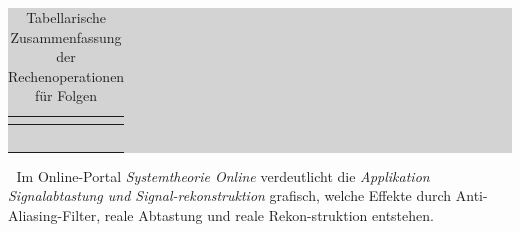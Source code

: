 \begin{table}[H]
\setlength{\arrayrulewidth}{.1em}
\caption{Tabellarische Zusammenfassung der Rechenoperationen f\"{u}r Folgen}
\setlength{\fboxsep}{0pt}%
\colorbox{lightgray}{%
%
\begin{tabular}{| l | l |}
\hline
\parbox[c][0.35in][c]{3.3in}{\smallskip\centering\textbf{\selectfont{Operation}}} & \parbox[c][0.35in][c]{3.3in}{\smallskip\centering\textbf{\selectfont{Mathematische Beschreibung}}}\\ \hline
\parbox[c][0.64in][c]{3.3in}{} & 
\parbox[c][0.64in][c]{3.3in}{}\\ \hline 

\parbox[c][0.64in][c]{3.3in}{} & 
\parbox[c][0.64in][c]{3.3in}{}\\ \hline


\parbox[c][0.64in][c]{3.3in}{} & \parbox[c][0.64in][c]{3.3in}{}\\ \hline

\parbox[c][0.64in][c]{3.3in}{} & \parbox[c][0.64in][c]{3.3in}{}\\ \hline

\parbox[c][0.64in][c]{3.3in}{} & 
\parbox[c][0.64in][c]{3.3in}{}\\ \hline

\end{tabular}%
}
\label{tab:threefour}
\end{table}

\textcolor{white}{.}\newline
\noindent Im Online-Portal \textit{Systemtheorie Online} verdeutlicht die \textit{Applikation Signalabtastung und Signal-rekonstruktion} grafisch, welche Effekte durch Anti-Aliasing-Filter, reale Abtastung und reale Rekon-struktion entstehen.\newline    

